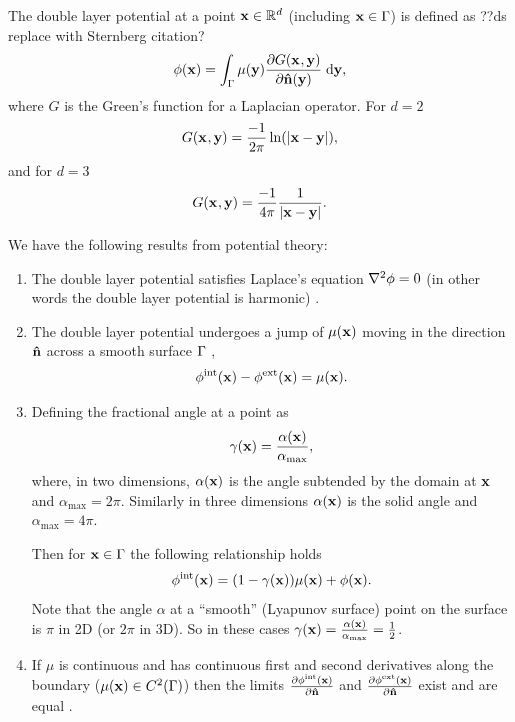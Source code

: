 The double layer potential at a point $\boldsymbol{\mathrm{x}} \in \mathbb{R}^d$ (including $\boldsymbol{\mathrm{x}} \in {\Gamma}$) is defined as \cite{eom_double_layer_potential} ??ds replace with Sternberg citation?
\begin{equation}
  \label{eq:3}
  \phi(\boldsymbol{\mathrm{x}}) = \int_{{\Gamma}} \mu(\boldsymbol{\mathrm{y}}) \frac{\partial G(\boldsymbol{\mathrm{x}}_{},\boldsymbol{\mathrm{y}})}{\partial \boldsymbol{\mathrm{\hat{n}}}(\boldsymbol{\mathrm{y}})} {\; \mathrm{{d}}} \boldsymbol{\mathrm{y}},
\end{equation}
where $G$ is the Green's function for a Laplacian operator.
For $d=2$
\begin{equation}
  G(\boldsymbol{\mathrm{x}}_{},\boldsymbol{\mathrm{y}}) = \dfrac{-1}{2\pi}\ln(\left|{\boldsymbol{\mathrm{x}} - \boldsymbol{\mathrm{y}}} \right|),
\end{equation}
and for $d=3$
\begin{equation} G(\boldsymbol{\mathrm{x}}_{},\boldsymbol{\mathrm{y}}) = \dfrac{-1}{4 \pi} \dfrac{1}{\left|{\boldsymbol{\mathrm{x}} - \boldsymbol{\mathrm{y}}} \right|}.
  \label{eqn:greenslaplacian3d}
\end{equation}


We have the following results from potential theory:
\begin{enumerate}
\item The double layer potential satisfies Laplace's equation $\nabla^2 \phi = 0$ (in other words the double layer potential is harmonic) \cite{Sternberg1946}.

\item The double layer potential undergoes a jump of $\mu(\boldsymbol{\mathrm{x}})$ moving in the direction $\boldsymbol{\mathrm{\hat{n}}}$ across a smooth surface ${\Gamma}$ \cite[136-140]{Sternberg1946}, \ie
  \begin{equation}
    \label{eq:15}
    \phi^{\mathrm{int}}(\boldsymbol{\mathrm{x}}) - \phi^{\mathrm{ext}}(\boldsymbol{\mathrm{x}}) = \mu(\boldsymbol{\mathrm{x}}).
  \end{equation}

\item Defining the fractional angle at a point as
  \begin{equation}
    \gamma(\boldsymbol{\mathrm{x}}) = \frac{\alpha(\boldsymbol{\mathrm{x}})}{\alpha_{\text{max}}},
  \end{equation}
  where, in two dimensions, $\alpha(\boldsymbol{\mathrm{x}})$ is the angle subtended by the domain at $\boldsymbol{\mathrm{x}}$ and $\alpha_{\text{max}} = 2\pi$.
  Similarly in three dimensions $\alpha(\boldsymbol{\mathrm{x}})$ is the solid angle and $\alpha_{\text{max}} = 4\pi$.

  Then for $\boldsymbol{\mathrm{x}} \in {\Gamma}$ the following relationship holds \cite[137-139, 155]{Sternberg1946}
  \begin{equation}
    \phi^{\mathrm{int}}(\boldsymbol{\mathrm{x}}) = (1 - \gamma(\boldsymbol{\mathrm{x}})) \mu(\boldsymbol{\mathrm{x}}) + \phi(\boldsymbol{\mathrm{x}}).
    \label{eq:22}
  \end{equation}
  Note that the angle $\alpha$ at a ``smooth'' (\ie Lyapunov surface) point on the surface is $\pi$ in 2D (or $2\pi$ in 3D).
  So in these cases $\gamma(\boldsymbol{\mathrm{x}}) = \frac{\alpha(\boldsymbol{\mathrm{x}})}{\alpha_{\text{max}}} = \frac{1}{2}$.

\item If $\mu$ is continuous and has continuous first and second derivatives along the boundary (\ie $\mu(\boldsymbol{\mathrm{x}}) \in C^2({\Gamma})$) then the limits $\frac{\partial \phi^{\mathrm{int}}(\boldsymbol{\mathrm{x}})}{\partial \boldsymbol{\mathrm{\hat{n}}}}$ and $\frac{\partial \phi^{\mathrm{ext}}(\boldsymbol{\mathrm{x}})}{\partial \boldsymbol{\mathrm{\hat{n}}}}$ exist and are equal \cite[145-153]{Sternberg1946}.

\end{enumerate}

